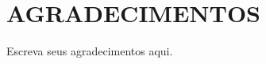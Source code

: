 \newpage
\thispagestyle{empty}
\vspace*{0.7cm}
\section*{\centering AGRADECIMENTOS}
\vspace{0.5cm}
Escreva seus agradecimentos aqui.
\newpage
